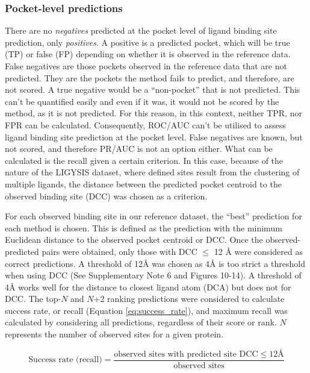 \subsubsection{Pocket-level predictions}

There are no \textit{negatives} predicted at the pocket level of ligand binding site prediction, only \textit{positives}. A positive is a predicted pocket, which will be true (TP) or false (FP) depending on whether it is observed in the reference data. False negatives are those pockets observed in the reference data that are not predicted. They are the pockets the method fails to predict, and therefore, are not scored. A true negative would be a ``non-pocket'' that is not predicted. This can't be quantified easily and even if it was, it would not be scored by the method, as it is not predicted. For this reason, in this context, neither TPR, nor FPR can be calculated. Consequently, ROC/AUC can't be utilised to assess ligand binding site prediction at the pocket level. False negatives are known, but not scored, and therefore PR/AUC is not an option either. What can be calculated is the recall given a certain criterion. In this case, because of the nature of the LIGYSIS dataset, where defined sites result from the clustering of multiple ligands, the distance between the predicted pocket centroid to the observed binding site (DCC) was chosen as a criterion.

For each observed binding site in our reference dataset, the ``best'' prediction for each method is chosen. This is defined as the prediction with the minimum Euclidean distance to the observed pocket centroid or DCC. Once the observed-predicted pairs were obtained, only those with DCC $\leq$ 12 \AA{} were considered as correct predictions. A threshold of 12\AA{} was chosen as 4\AA{} is too strict a threshold when using DCC (See Supplementary Note 6 and Figures 10-14). A threshold of 4\AA{} works well for the distance to closest ligand atom (DCA) but does not for DCC. The top-$N$ and $N$+2 ranking predictions were considered to calculate success rate, or recall (Equation \ref{eq:success_rate}), and maximum recall was calculated by considering all predictions, regardless of their score or rank. $N$ represents the number of observed sites for a given protein.

\begin{equation}
\text{Success rate (recall)} = \frac{\text{observed sites with predicted site DCC} \leq 12 \text{Å}}{\text{observed sites}}
\label{eq:success_rate}
\end{equation}

